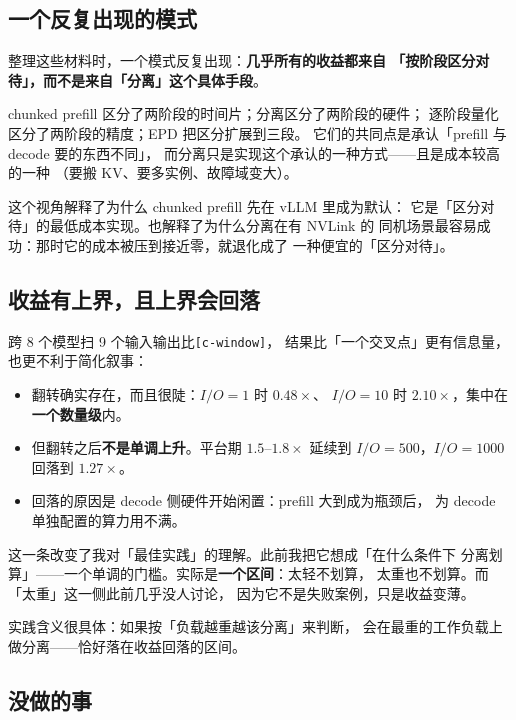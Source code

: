 \subsection{一个反复出现的模式}

整理这些材料时，一个模式反复出现：\textbf{几乎所有的收益都来自
「按阶段区分对待」，而不是来自「分离」这个具体手段}。

chunked prefill 区分了两阶段的时间片；分离区分了两阶段的硬件；
逐阶段量化区分了两阶段的精度；EPD 把区分扩展到三段。
它们的共同点是承认「prefill 与 decode 要的东西不同」，
而分离只是实现这个承认的一种方式——且是成本较高的一种
（要搬 KV、要多实例、故障域变大）。

这个视角解释了为什么 chunked prefill 先在 vLLM 里成为默认：
它是「区分对待」的最低成本实现。也解释了为什么分离在有 NVLink 的
同机场景最容易成功：那时它的成本被压到接近零，就退化成了
一种便宜的「区分对待」。

\subsection{收益有上界，且上界会回落}

跨 8 个模型扫 9 个输入输出比\texttt{[c-window]}，
结果比「一个交叉点」更有信息量，也更不利于简化叙事：

\begin{itemize}[leftmargin=1.3em,itemsep=1.5pt,topsep=2pt]
  \item 翻转确实存在，而且很陡：$I/O=1$ 时 $0.48\times$、
        $I/O=10$ 时 $2.10\times$，集中在\textbf{一个数量级}内。
  \item 但翻转之后\textbf{不是单调上升}。平台期 $1.5$--$1.8\times$
        延续到 $I/O=500$，$I/O=1000$ 回落到 $1.27\times$。
  \item 回落的原因是 decode 侧硬件开始闲置：prefill 大到成为瓶颈后，
        为 decode 单独配置的算力用不满。
\end{itemize}

这一条改变了我对「最佳实践」的理解。此前我把它想成「在什么条件下
分离划算」——一个单调的门槛。实际是\textbf{一个区间}：太轻不划算，
太重也不划算。而「太重」这一侧此前几乎没人讨论，
因为它不是失败案例，只是收益变薄。

实践含义很具体：如果按「负载越重越该分离」来判断，
会在最重的工作负载上做分离——恰好落在收益回落的区间。

\subsection{没做的事}


